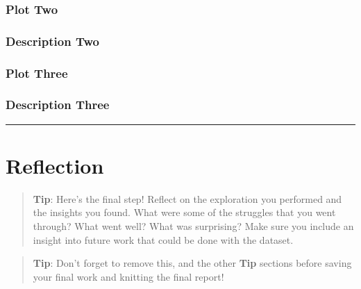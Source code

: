 \documentclass[]{article}
\begin{document}
\subsubsection{Plot Two}\label{plot-two}

\subsubsection{Description Two}\label{description-two}

\subsubsection{Plot Three}\label{plot-three}

\subsubsection{Description Three}\label{description-three}

\begin{center}\rule{0.5\linewidth}{\linethickness}\end{center}

\section{Reflection}\label{reflection}

\begin{quote}
\textbf{Tip}: Here's the final step! Reflect on the exploration you
performed and the insights you found. What were some of the struggles
that you went through? What went well? What was surprising? Make sure
you include an insight into future work that could be done with the
dataset.
\end{quote}

\begin{quote}
\textbf{Tip}: Don't forget to remove this, and the other \textbf{Tip}
sections before saving your final work and knitting the final report!
\end{quote}
\end{document}
